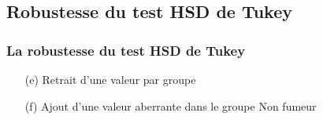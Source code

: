\documentclass{beamer}
\begin{document}
\subsection{Robustesse du test HSD de Tukey}
\begin{frame}
	\frametitle{La robustesse du test HSD de Tukey}
	
		\begin{figure}[H]
	\centering
	    \qquad
    \end{figure}
    
    \begin{itemize}
		\item[(e)] Retrait d'une valeur par groupe
		\item[(f)] Ajout d'une valeur aberrante dans le groupe Non fumeur
	\end{itemize}
\end{frame}
\end{document}
